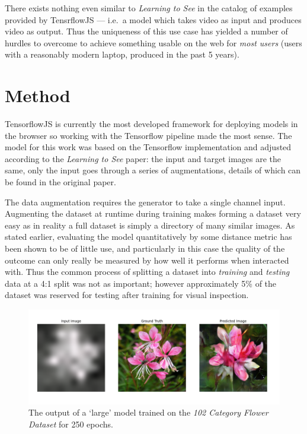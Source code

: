 \documentclass{article}
\begin{document}
There exists nothing even similar to \textit{Learning to See} in the catalog of examples provided by TensrflowJS --- i.e.\ a model which takes video as input and produces video as output. Thus the uniqueness of this use case has yielded a number of hurdles to overcome to achieve something usable on the web for \textit{most users} (users with a reasonably modern laptop, produced in the past 5 years).


\section{Method}
TensorflowJS is currently the most developed framework for deploying models in the browser so working with the Tensorflow pipeline made the most sense. The model for this work was based on the Tensorflow implementation\cite{tf_p2p} and adjusted according to the \textit{Learning to See} paper: the input and target images are the same, only the input goes through a series of augmentations, details of which can be found in the original paper\cite{2003.00902}.

The data augmentation requires the generator to take a single channel input. Augmenting the dataset at runtime during training makes forming a dataset very easy as in reality a full dataset is simply a directory of many similar images. As stated earlier, evaluating the model quantitatively by some distance metric has been shown to be of little use, and particularly in this case the quality of the outcome can only really be measured by how well it performs when interacted with. Thus the common process of splitting a dataset into \textit{training} and \textit{testing} data at a 4:1 split was not as important; however approximately 5\% of the dataset was reserved for testing after training for visual inspection.

\begin{figure}
	\centering
	\includegraphics[width=\textwidth]{250_epochs}
	\caption{The output of a `large' model trained on the \textit{102 Category Flower Dataset}\cite{flowers_dataset} for 250 epochs.}
\end{figure}
\end{document}
